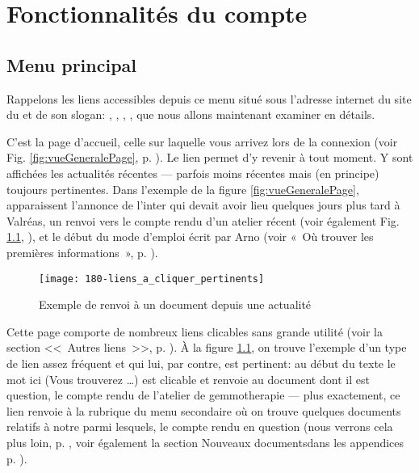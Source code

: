 \chapter{Fonctionnalités du compte}\label{chap:fonctionnalitesCompte}

\section{Menu principal}

Rappelons les liens accessibles depuis ce menu situé sous l'adresse internet du site du \CdS{} et de son slogan: , , , ,  que nous allons maintenant examiner en détails.

C’est la page d’accueil, celle sur laquelle vous arrivez lors de la connexion (voir Fig. \ref{fig:vueGeneralePage}, p. \pageref{fig:vueGeneralePage}). Le lien  permet d’y revenir à tout moment.  Y sont affichées les actualités récentes --- parfois moins récentes mais (en principe) toujours pertinentes. Dans l’exemple de la figure \ref{fig:vueGeneralePage}, apparaissent l’annonce de l’inter\sel{} qui devait avoir lieu quelques jours plus tard à Valréas, un renvoi vers le compte rendu d’un atelier récent (voir également Fig. \ref{fig:liensPertinents}, ), et le début du mode d’emploi écrit par Arno (voir «~Où trouver les premières informations~», p. \pageref{page:premieresInfos}).
\begin{figure}
    \texttt{[image: 180-liens\_a\_cliquer\_pertinents]}
    \caption{Exemple de renvoi à un document depuis une actualité}
    \label{fig:liensPertinents}
\end{figure}

Cette page comporte de nombreux liens clicables sans grande utilité (voir la section <<~Autres liens~>>, p. \pageref{page:autresLiens}). \label{page:lienIci}À la figure \ref{fig:liensPertinents}, on trouve l'exemple d'un type de lien assez fréquent et qui lui, par contre, est pertinent: au début du texte le mot ici (Vous trouverez  …) est clicable et renvoie au document dont il est question, \cad{} le compte rendu de l’atelier de gemmotherapie --- plus exactement, ce lien renvoie à la rubrique  du menu secondaire où on trouve quelques documents relatifs à notre \sel{} parmi lesquels, le compte rendu en question (nous verrons cela plus loin, p. \pageref{sec:docs}, voir également la section \og Nouveaux documents\fg dans les appendices p. \pageref{sec:nouveauxDocuments}).


